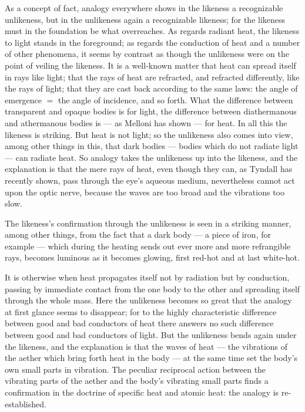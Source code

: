 \documentclass[12pt,a4paper]{book}
\begin{document}
As a concept of fact, analogy everywhere shows in the likeness a recognizable unlikeness, but in the unlikeness again a
recognizable likeness; for the likeness must in the foundation be what overreaches. As regards radiant heat, the likeness
to light stands in the foreground; as regards the conduction of heat and a number of other phenomena, it seems by
contrast as though the unlikeness were on the point of veiling the likeness. It is a well-known matter that heat can
spread itself in rays like light; that the rays of heat are refracted, and refracted differently, like the rays of light;
that they are cast back according to the same laws: the angle of emergence $=$ the angle of incidence, and so forth. What
the difference between transparent and opaque bodies is for light, the difference between diathermanous and athermanous
bodies is --- as Melloni has shown --- for heat. In all this the likeness is striking. But heat is not light; so the
unlikeness also comes into view, among other things in this, that dark bodies --- bodies which do not radiate light ---
can radiate heat. So analogy takes the unlikeness up into the likeness, and the explanation is that the mere rays of heat,
even though they can, as Tyndall has recently shown, pass through the eye's aqueous medium, nevertheless cannot act upon
the optic nerve, because the waves are too broad and the vibrations too slow.

The likeness's confirmation through the unlikeness is seen in a striking manner, among other things, from the fact that a
dark body --- a piece of iron, for example --- which during the heating sends out ever more and more refrangible rays,
becomes luminous as
it becomes glowing, first red-hot and at last white-hot.

It is otherwise when heat propagates itself not by radiation but by conduction, passing by immediate contact from the one
body to the other and spreading itself through the whole mass. Here the unlikeness becomes so great that the analogy at
first glance seems to disappear; for to the highly characteristic difference between good and bad conductors of heat
there answers no such difference between good and bad conductors of light. But the unlikeness bends again under the
likeness, and the explanation is that the waves of heat --- the vibrations of the aether which bring forth heat in the
body --- at the same time set the body's own small parts in vibration. The peculiar reciprocal action between the
vibrating parts of the aether and the body's vibrating small parts finds a confirmation in the doctrine of specific heat
and atomic heat: the analogy is re-established.
\end{document}
